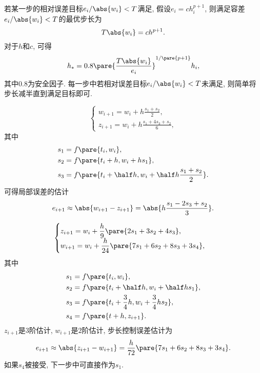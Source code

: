 \documentclass{ctexart}
\begin{document}
若某一步的相对误差目标$e_i/\abs{w_i} < T$满足, 假设$e_i = ch_i^{p+1}$, 则满足容差$e_i/\abs{w_i} < T$的最优步长为
\[ T\abs{w_i} = ch^{p+1}. \]
对于$h$和$c$, 可得
\[ h_* = 0.8 \pare{\frac{T\abs{w_i}}{e_i}}^{1/\pare{p+1}}h_i, \]
其中$0.8$为安全因子. 每一步中若相对误差目标$e_i/\abs{w_i} < T$未满足, 则简单将步长减半直到满足目标即可.
\begin{ex}
    \[ \begin{cases}
        \displaystyle w_{i+1} = w_i + h \frac{s_1 + s_2}{2}, \\
        \displaystyle z_{i+1} = w_i + h \frac{s_1 + 4s_3 + s_2}{6},
    \end{cases} \]
    其中
    \begin{align*}
        s_1 &= f\pare{t_i,w_i}, \\
        s_2 &= f\pare{t_i + h, w_i + hs_1}, \\
        s_3 &= f\pare{t_i + \half h, w_i + \half h \frac{s_1+s_2}{2}}.
    \end{align*}
    可得局部误差的估计
    \[ e_{i+1} \approx \abs{w_{i+1} - z_{i+1}} = \abs{h\frac{s_1 - 2s_3+s_2}{3}}. \]
\end{ex}
\begin{ex}
    \[ \begin{cases}
        \displaystyle z_{i+1} = w_i + \frac{h}{9}\pare{2s_1 + 3s_2 + 4s_3}, \\
        \displaystyle w_{i+1} = w_i + \frac{h}{24}\pare{7s_1 + 6s_2 + 8s_3 + 3s_4},
    \end{cases} \]
    其中
    \begin{align*}
        s_1 &= f\pare{t_i,w_i}, \\
        s_2 &= f\pare{t_i + \half h, w_i + \half hs_1}, \\
        s_3 &= f\pare{t_i + \frac{3}{4}h, w_i + \frac{3}{4}hs_2}, \\
        s_4 &= f\pare{t+h, z_{i+1}}.
    \end{align*}
    $z_{i+1}$是$3$阶估计, $w_{i+1}$是$2$阶估计, 步长控制误差估计为
    \[ e_{i+1} \approx \abs{z_{i+1} - w_{i+1}} = \frac{h}{72}\pare{7s_1 + 6s_2 + 8s_3 + 3s_4}. \]
    如果$s_4$被接受, 下一步中可直接作为$s_1$.
\end{ex}
\end{document}
